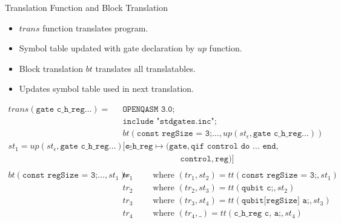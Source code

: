 \begin{frame}{Translation Function and Block Translation}
    \begin{itemize}
        \item $trans$ function translates program.
        \item Symbol table updated with gate declaration by $up$ function.
        \item Block translation $bt$ translates all translatables.
        \item Updates symbol table used in next translation.
    \end{itemize}
    \Large
    \begin{align*}
        trans(\texttt{gate c\_h\_reg} \dots) =& \ \texttt{OPENQASM 3.0;}\\
                                              & \ \texttt{include "stdgates.inc";}\\
                                              & \ bt(\texttt{const regSize = 3;} \dots, up(st_\epsilon, \texttt{gate c\_h\_reg} \dots))\\
        st_1 = up(st_\epsilon, \texttt{gate c\_h\_reg} \dots) =& \ 
        [ \texttt{c\_h\_reg} \mapsto (\texttt{gate}, \texttt{qif control do ... end}, \\
        & \quad\quad\quad\quad\quad\quad\quad \texttt{control}, \texttt{reg})  ]\\
        &\\
        bt(\texttt{const regSize = 3;} \dots, st_1) =& \ tr_1 \quad \quad \text{ where } (tr_1, st_2) = tt(\texttt{const regSize = 3;}, st_1)\\ 
                                                & \ tr_2 \quad \quad \text{ where } (tr_2, st_3) = tt(\texttt{qubit c;}, st_2)\\ 
                                                & \ tr_3 \quad \quad \text{ where } (tr_3, st_4) = tt(\texttt{qubit[regSize] a;}, st_3)\\ 
                                                & \ tr_4 \quad \quad \text{ where } (tr_4, \_) = tt(\texttt{c\_h\_reg c, a;}, st_4)
    \end{align*}
\end{frame}

